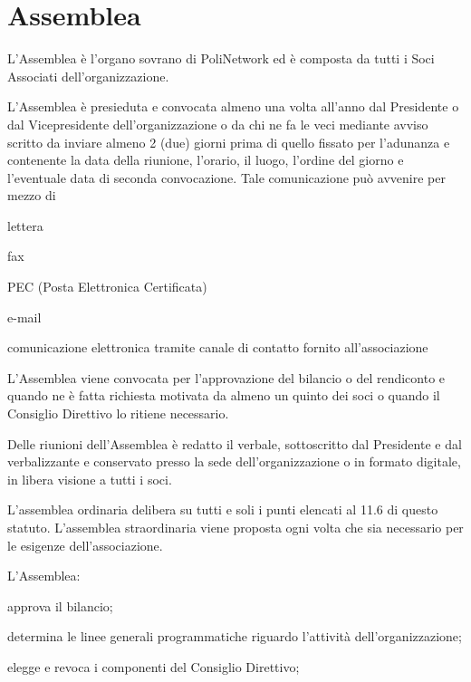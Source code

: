 \documentclass[legalpaper, 11pt]{exam}
\let\tempone\enumerate
\let\temptwo\endenumerate
\renewenvironment{enumerate}{\tempone\addtolength{\itemsep}{-0.45\baselineskip}}{\temptwo}
\begin{document}
{\section{Assemblea}

\begin{enumerate}
	\item L’Assemblea è l’organo sovrano di PoliNetwork ed è composta da tutti i Soci Associati dell’organizzazione.
	\item L’Assemblea è presieduta e convocata almeno una volta all’anno dal Presidente o dal Vicepresidente dell’organizzazione o da chi ne fa le veci mediante avviso scritto da inviare almeno 2 (due) giorni prima di quello fissato per l’adunanza e contenente la data della riunione, l’orario, il luogo, l’ordine del giorno e l’eventuale data di seconda convocazione. Tale comunicazione può avvenire per mezzo di
	\vspace{-5pt}
	\begin{enumerate}
		\item lettera
		\item fax
		\item PEC (Posta Elettronica Certificata)
		\item e-mail
		\item comunicazione elettronica tramite canale di contatto fornito all’associazione
	\end{enumerate}
	\item L’Assemblea viene convocata per l’approvazione del bilancio o del rendiconto e quando ne è fatta richiesta motivata da almeno un quinto dei soci o quando il Consiglio Direttivo lo ritiene necessario.
	\item Delle riunioni dell’Assemblea è redatto il verbale, sottoscritto dal Presidente e dal verbalizzante e conservato presso la sede dell’organizzazione o in formato digitale, in libera visione a tutti i soci.
	\item L’assemblea ordinaria delibera su tutti e soli i punti elencati al 11.6 di questo statuto. L’assemblea straordinaria viene proposta ogni volta che sia necessario per le esigenze dell’associazione.
	\item L'Assemblea:
	\vspace{-5pt}
	\begin{enumerate}
		\item approva il bilancio;
		\item determina le linee generali programmatiche riguardo l’attività dell’organizzazione;
		\item elegge e revoca i componenti del Consiglio Direttivo;

\end{enumerate}
\end{enumerate}}
\end{document}
